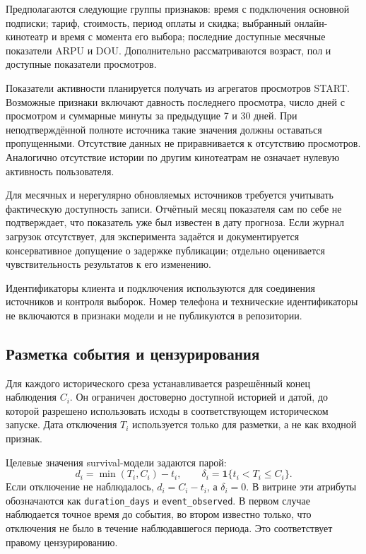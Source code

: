 \documentclass{misisarticle}
\begin{document}
Предполагаются следующие группы признаков: время с подключения основной подписки; тариф, стоимость, период оплаты и скидка; выбранный онлайн-кинотеатр и время с момента его выбора; последние доступные месячные показатели ARPU и DOU. Дополнительно рассматриваются возраст, пол и доступные показатели просмотров.

Показатели активности планируется получать из агрегатов просмотров START. Возможные признаки включают давность последнего просмотра, число дней с просмотром и суммарные минуты за предыдущие 7 и 30 дней. При неподтверждённой полноте источника такие значения должны оставаться пропущенными. Отсутствие данных не приравнивается к отсутствию просмотров. Аналогично отсутствие истории по другим кинотеатрам не означает нулевую активность пользователя.

Для месячных и нерегулярно обновляемых источников требуется учитывать фактическую доступность записи. Отчётный месяц показателя сам по себе не подтверждает, что показатель уже был известен в дату прогноза. Если журнал загрузок отсутствует, для эксперимента задаётся и документируется консервативное допущение о задержке публикации; отдельно оценивается чувствительность результатов к его изменению.

Идентификаторы клиента и подключения используются для соединения источников и контроля выборок. Номер телефона и технические идентификаторы не включаются в признаки модели и не публикуются в репозитории.

\subsection{Разметка события и цензурирования}

Для каждого исторического среза устанавливается разрешённый конец наблюдения $C_i$. Он ограничен достоверно доступной историей и датой, до которой разрешено использовать исходы в соответствующем историческом запуске. Дата отключения $T_i$ используется только для разметки, а не как входной признак.

Целевые значения survival-модели задаются парой:
\begin{equation}
 d_i=\min(T_i,C_i)-t_i,\qquad
 \delta_i=\mathbf{1}\{t_i<T_i\leq C_i\}.
\end{equation}
Если отключение не наблюдалось, $d_i=C_i-t_i$, а $\delta_i=0$. В витрине эти атрибуты обозначаются как \texttt{duration\_days} и \texttt{event\_observed}. В первом случае наблюдается точное время до события, во втором известно только, что отключения не было в течение наблюдавшегося периода. Это соответствует правому цензурированию.
\end{document}

